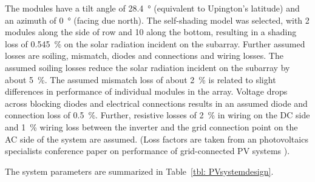
The modules have a tilt angle of \SI{28.4}{\degree} (equivalent to Upington's latitude) and an azimuth of \SI{0}{\degree} (facing due north). The self-shading model was selected, with \num{2} modules along the side of row and \num{10} along the bottom, resulting in a shading loss of \SI{0.545}{\percent} on the solar radiation incident on the subarray. Further assumed losses are soiling, mismatch, diodes and connections and wiring losses. The assumed soiling losses reduce the solar radiation incident on the subarray by about \SI{5}{\percent}. The assumed mismatch loss of about \SI{2}{\percent} is related to slight differences in performance of individual modules in the array. Voltage drops across blocking diodes and electrical connections results in an assumed diode and connection loss of \SI{0.5}{\percent}. Further, resistive losses of \SI{2}{\percent} in wiring on the \ac{DC} side and \SI{1}{\percent} wiring loss between the inverter and the grid connection point on the \ac{AC} side of the system are assumed. (Loss factors are taken from an 
 photovoltaics specialists conference paper on performance of grid-connected \ac{PV} systems \cite{Marion2005}).

The system parameters are summarized in Table~\ref{tbl: PVsystemdesign}.

